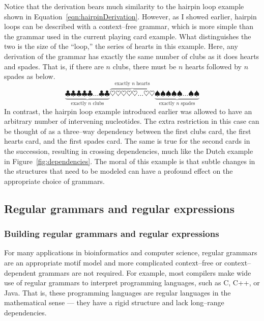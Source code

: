 Notice that the derivation bears much similarity to the hairpin loop
example shown in Equation~\vref{eqn:hairpinDerivation}.  However, as
I showed earlier, hairpin loops can be described with a
context--free grammar, which is more simple than the grammar used in
the current playing card example.  What distinguishes the two is the
size of the ``loop,'' the series of hearts in this example.  Here,
any derivation of the grammar has exactly the same number of clubs
as it does hearts and spades.  That is, if there are $n$ clubs,
there must be $n$ hearts followed by $n$ spades as below.
\begin{equation}\label{eqn:csMotif}
    \underbrace{\clubsuit\clubsuit\clubsuit\clubsuit\clubsuit\ldots\clubsuit\clubsuit}_{\textrm{exactly $n$ clubs}}
    \overbrace{\heartsuit\heartsuit\heartsuit\heartsuit\heartsuit\ldots\heartsuit\heartsuit}^{\textrm{exactly $n$ hearts}}
    \underbrace{\spadesuit\spadesuit\spadesuit\spadesuit\spadesuit\ldots\spadesuit\spadesuit}_{\textrm{exactly $n$ spades}}
\end{equation}
In contrast, the hairpin loop example introduced earlier was allowed
to have an arbitrary number of intervening nucleotides.  The extra
restriction in this case can be thought of as a three--way
dependency between the first clubs card, the first hearts card, and
the first spades card.  The same is true for the second cards in the
succession, resulting in crossing dependencies, much like the Dutch
example in Figure~\vref{fig:dependencies}.  The moral of this
example is that subtle changes in the structures that need to be
modeled can have a profound effect on the appropriate choice of
grammars.

\subsection*{Regular grammars and regular expressions}\label{section:regex}

\subsubsection*{Building regular grammars and regular expressions}
    For many applications in bioinformatics and computer science,
    regular grammars are an appropriate motif model and more
    complicated context--free or context--dependent grammars are not
    required.  For example, most compilers make wide use of regular
    grammars to interpret programming languages, such as C, C++, or
    Java.  That is, these programming languages are regular
    languages in the mathematical sense --- they have a rigid
    structure and lack long--range dependencies.

